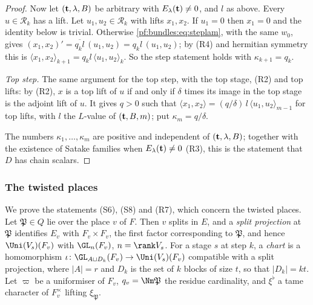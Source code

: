 \begin{proof}
Now let $(\mathbf t,\lambda,B)$ be arbitrary with $E_\lambda(\mathbf t)\ne0$, and $l$ as above. Every $u\in\mathcal R_k$ has a lift. Let $u_1,u_2\in\mathcal
R_k$ with lifts $x_1,x_2$. If $u_1=0$ then $x_1=0$ and the identity below is trivial. Otherwise \eqref{pf:bundles:eq:steplam}, with the same
$w_0$, gives $(x_1,x_2)'=\overline{q_kl}\,(u_1,u_2)=q_kl\,(u_1,u_2)$; by (R4) and hermitian symmetry this is $\langle x_1,x_2\rangle_{k+1}=q_kl\,\langle
u_1,u_2\rangle_k$. So the step statement holds with $\kappa_{k+1}=q_k$.

\emph{Top step.} The same argument for the top step, with the top stage, (R2) and top lifts: by (R2), $x$ is a top lift of $u$ if and only if
$\delta$ times its image in the top stage is the adjoint lift of $u$. It gives $q>0$ such that $\langle x_1,x_2\rangle=(q/\delta)\,l\,\langle
u_1,u_2\rangle_{m-1}$ for top lifts, with $l$ the $L$-value of $(\mathbf t,B,m)$; put $\kappa_m=q/\delta$.

The numbers $\kappa_1,\dots,\kappa_m$ are positive and independent of $(\mathbf t,\lambda,B)$; together with the existence of Satake families when
$E_\lambda(\mathbf t)\ne0$ (R3), this is the statement that $D$ has chain scalars.
\end{proof}

\subsubsection{The twisted places}\label{pf:bundles:twisted}

We prove the statements (S6), (S8) and (R7), which concern the twisted places. Let $\mathfrak P\in Q$ lie over the place $v$ of $F$. Then $v$
splits in $E$, and a \emph{split projection} at $\mathfrak P$ identifies $E_v$ with $F_v\times F_v$, the first factor corresponding to
$\mathfrak P$, and hence $\Uni(V_s)(F_v)$ with $\GL_n(F_v)$, $n=\rank V_s$. For a stage $s$ at step $k$, a \emph{chart} is a homomorphism
$\iota\colon\GL_{A\sqcup D_k}(F_v)\to\Uni(V_s)(F_v)$ compatible with a split projection, where $|A|=r$ and $D_k$ is the set of $k$ blocks of
size $t$, so that $|D_k|=kt$. Let $\varpi$ be a uniformiser of $F_v$, $q_v=\Nm\mathfrak P$ the residue cardinality, and $\xi^\flat$ a tame
character of $F_v^\times$ lifting $\xi_{\mathfrak P}$.

